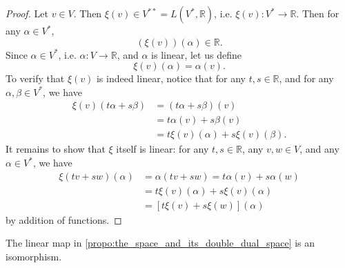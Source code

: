 \documentclass[notoc,notitlepage]{tufte-book}
\begin{document}
\begin{proof}

  Let $v \in V$. Then $\xi(v) \in V^{**} = L(V^*, \mathbb{R})$,
  i.e. $\xi(v) : V^* \to \mathbb{R}$. Then for any $\alpha \in V^*$,
  \begin{equation*}
    \left( \xi(v) \right)(\alpha) \in \mathbb{R}.
  \end{equation*}
  Since $\alpha \in V^*$, i.e. $\alpha : V \to \mathbb{R}$,
  and $\alpha$ is linear, let us define
  \begin{equation*}
    \xi(v)(\alpha) = \alpha(v).
  \end{equation*}
  To verify that $\xi(v)$ is indeed linear, notice that
  for any $t, s \in \mathbb{R}$, and for any $\alpha, \beta \in V^*$,
  we have
  \begin{align*}
    \xi(v)(t \alpha + s \beta)
      &= (t \alpha + s \beta) (v) \\
      &= t \alpha(v) + s \beta(v) \\
      &= t \xi(v)(\alpha) + s \xi(v)(\beta).
  \end{align*}
  It remains to show that $\xi$ itself is linear:
  for any $t, s \in \mathbb{R}$, any $v, w \in V$,
  and any $\alpha \in V^*$, we have
  \begin{align*}
    \xi(tv + sw)(\alpha)
      &= \alpha (tv + sw) = t \alpha(v) + s \alpha(w) \\
      &= t \xi(v)(\alpha) + s \xi(v)(\alpha) \\
      &= [ t \xi(v) + s \xi(w) ](\alpha)
  \end{align*}
  by addition of functions.
\end{proof}

\begin{propo}\label{propo:isomorphism_between_the_space_and_its_dual_space}
  The linear map in \cref{propo:the_space_and_its_double_dual_space} is an isomorphism.
\end{propo}
\end{document}
